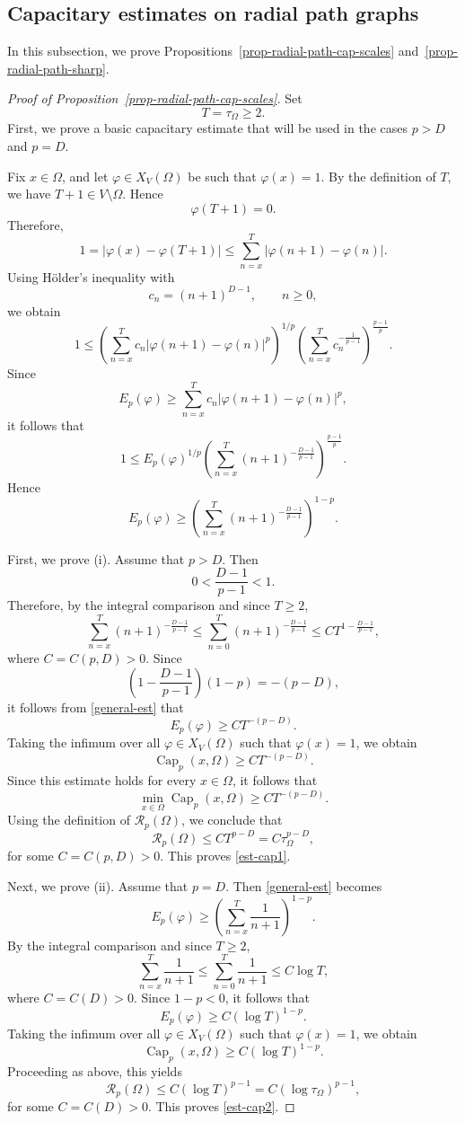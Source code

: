 \documentclass[twoside,12pt,letter]{article}
\theoremstyle{plain}
\theoremstyle{definition}
\theoremstyle{remark}
\numberwithin{equation}{section}
\begin{document}
\subsection{Capacitary estimates on radial path graphs}

In this subsection, we prove Propositions~\ref{prop-radial-path-cap-scales}
and~\ref{prop-radial-path-sharp}.

\begin{proof}[Proof of Proposition~\ref{prop-radial-path-cap-scales}]
Set
\[
T=\tau_\Omega\ge 2.
\]
First, we prove a basic capacitary estimate that will be used in the cases
\(p>D\) and \(p=D\).

Fix \(x\in\Omega\), and let \(\varphi\in X_V(\Omega)\) be such that
\(\varphi(x)=1\). By the definition of \(T\), we have
\(T+1\in V\setminus\Omega\). Hence
\[
\varphi(T+1)=0.
\]
Therefore,
\[
1
=
|\varphi(x)-\varphi(T+1)|
\le
\sum_{n=x}^{T}|\varphi(n+1)-\varphi(n)|.
\]
Using H\"older's inequality with
\[
c_n=(n+1)^{D-1},\qquad n\ge 0,
\]
we obtain
\[
1
\le
\left(
\sum_{n=x}^{T} c_n |\varphi(n+1)-\varphi(n)|^p
\right)^{1/p}
\left(
\sum_{n=x}^{T} c_n^{-\frac{1}{p-1}}
\right)^{\frac{p-1}{p}}.
\]
Since
\[
E_p(\varphi)
\ge
\sum_{n=x}^{T} c_n |\varphi(n+1)-\varphi(n)|^p,
\]
it follows that
\[
1
\le
E_p(\varphi)^{1/p}
\left(
\sum_{n=x}^{T} (n+1)^{-\frac{D-1}{p-1}}
\right)^{\frac{p-1}{p}}.
\]
Hence
\begin{equation}\label{general-est}
E_p(\varphi)
\ge
\left(
\sum_{n=x}^{T} (n+1)^{-\frac{D-1}{p-1}}
\right)^{1-p}.
\end{equation}

First, we prove {\rm(i)}. Assume that \(p>D\). Then
\[
0<\frac{D-1}{p-1}<1.
\]
Therefore, by the integral comparison and since \(T\ge 2\),
\[
\sum_{n=x}^{T} (n+1)^{-\frac{D-1}{p-1}}
\le
\sum_{n=0}^{T} (n+1)^{-\frac{D-1}{p-1}}
\le
C T^{1-\frac{D-1}{p-1}},
\]
where \(C=C(p,D)>0\). Since
\[
\left(1-\frac{D-1}{p-1}\right)(1-p)=-(p-D),
\]
it follows from \eqref{general-est} that
\[
E_p(\varphi)
\ge
C T^{-(p-D)}.
\]
Taking the infimum over all \(\varphi\in X_V(\Omega)\) such that
\(\varphi(x)=1\), we obtain
\[
\operatorname{Cap}_p(x,\Omega)
\ge
C T^{-(p-D)}.
\]
Since this estimate holds for every \(x\in\Omega\), it follows that
\[
\min_{x\in\Omega}\operatorname{Cap}_p(x,\Omega)
\ge
C T^{-(p-D)}.
\]
Using the definition of \(\mathcal{R}_p(\Omega)\), we conclude that
\[
\mathcal{R}_p(\Omega)
\le
C T^{p-D}
=
C\tau_\Omega^{p-D},
\]
for some \(C=C(p,D)>0\). This proves \eqref{est-cap1}.

Next, we prove {\rm(ii)}. Assume that \(p=D\). Then \eqref{general-est}
becomes
\[
E_p(\varphi)
\ge
\left(
\sum_{n=x}^{T}\frac{1}{n+1}
\right)^{1-p}.
\]
By the integral comparison and since \(T\ge 2\),
\[
\sum_{n=x}^{T}\frac{1}{n+1}
\le
\sum_{n=0}^{T}\frac{1}{n+1}
\le
C\log T,
\]
where \(C=C(D)>0\). Since \(1-p<0\), it follows that
\[
E_p(\varphi)
\ge
C(\log T)^{1-p}.
\]
Taking the infimum over all \(\varphi\in X_V(\Omega)\) such that
\(\varphi(x)=1\), we obtain
\[
\operatorname{Cap}_p(x,\Omega)
\ge
C(\log T)^{1-p}.
\]
Proceeding as above, this yields
\[
\mathcal{R}_p(\Omega)
\le
C(\log T)^{p-1}
=
C(\log \tau_\Omega)^{p-1},
\]
for some \(C=C(D)>0\). This proves \eqref{est-cap2}.


\end{proof}
\end{document}
